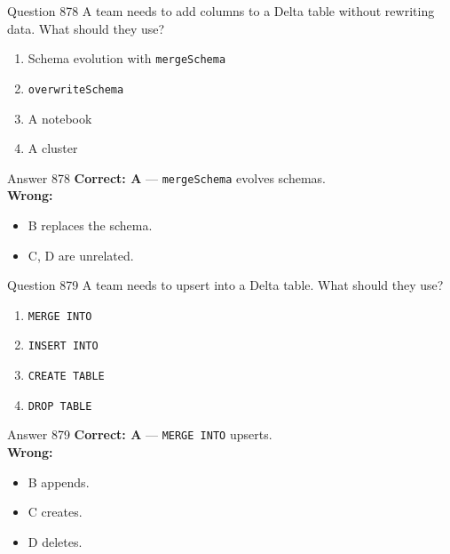 \documentclass[aspectratio=169,11pt]{beamer}
\begin{document}
	\begin{frame}{Question 878}
		A team needs to add columns to a Delta table without rewriting data. What should they use?
		\begin{enumerate}[label=\Alph*.]
			\item Schema evolution with \texttt{mergeSchema}
			\item \texttt{overwriteSchema}
			\item A notebook
			\item A cluster
		\end{enumerate}
	\end{frame}
	\begin{frame}{Answer 878}
		\textbf{Correct: A} --- \texttt{mergeSchema} evolves schemas.\\
		\vspace{0.5em}
		\textbf{Wrong:}
		\begin{itemize}
			\item B replaces the schema.
			\item C, D are unrelated.
		\end{itemize}
	\end{frame}
	
	\begin{frame}{Question 879}
		A team needs to upsert into a Delta table. What should they use?
		\begin{enumerate}[label=\Alph*.]
			\item \texttt{MERGE INTO}
			\item \texttt{INSERT INTO}
			\item \texttt{CREATE TABLE}
			\item \texttt{DROP TABLE}
		\end{enumerate}
	\end{frame}
	\begin{frame}{Answer 879}
		\textbf{Correct: A} --- \texttt{MERGE INTO} upserts.\\
		\vspace{0.5em}
		\textbf{Wrong:}
		\begin{itemize}
			\item B appends.
			\item C creates.
			\item D deletes.
		\end{itemize}
	\end{frame}
	
\end{document}

